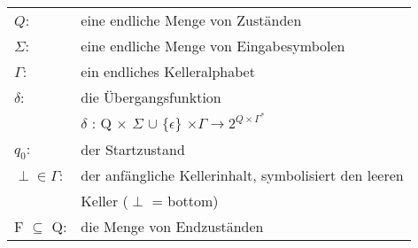 \documentclass[
    border=0.2cm,
    convert={density=600}
]{standalone}
\begin{document}
\begin{tabular}{lp{11 cm}}
	$Q$: & eine endliche Menge von Zuständen\\
	$\Sigma$: & eine endliche Menge von Eingabesymbolen\\
	$\Gamma$: & ein endliches Kelleralphabet\\
	$\delta$: & die Übergangsfunktion\\
	&$\delta$ : Q $\times$ $\Sigma$ $\cup$ $\lbrace \epsilon\rbrace$ $\times \Gamma \to 2^{Q \times
		\Gamma^*{}}$ \\
	$q_0$:& der Startzustand\\
	$\perp \in \Gamma$: &  der anfängliche Kellerinhalt, symbolisiert den leeren\\
	& Keller ($\perp$ = bottom)\\
	F $\subseteq$ Q: & die Menge von Endzuständen
\end{tabular}
\end{document}
